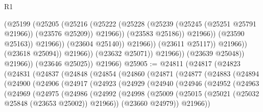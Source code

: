 \begin{lexlean}{R1}
\begin{coremodule}
                                            (@25199
                                              (@25205
                                                (@25216
                                                  (@25222
                                                    (@25228
                                                      (@25239
                                                        (@25245 (@25251 @25791 @21966))
                                                        (@23576 @25209))
                                                      @21966))
                                                  (@23583 @25186))
                                                @21966))
                                            (@23590 @25163))
                                          @21966))
                                      (@23604 @25140))
                                    @21966))
                                (@23611 @25117))
                              @21966))
                          (@23618 @25094))
                        @21966))
                    (@23632 @25071))
                  @21966))
              (@23639 @25048))
            @21966))
        (@23646 @25025))
      @21966)
@25905 := @24811
    (@24817
      (@24823
        (@24831
          (@24837
            (@24848
              (@24854
                (@24860
                  (@24871
                    (@24877
                      (@24883
                        (@24894
                          (@24900
                            (@24906
                              (@24917
                                (@24923
                                  (@24929
                                    (@24940
                                      (@24946
                                        (@24952
                                          (@24963
                                            (@24969
                                              (@24975
                                                (@24986
                                                  (@24992
                                                    (@24998
                                                      (@25009
                                                        (@25015
                                                          (@25021
                                                            (@25032 @25848 (@23653 @25002))
                                                            @21966))
                                                        (@23660 @24979))
                                                      @21966))

\end{coremodule}
\end{lexlean}
